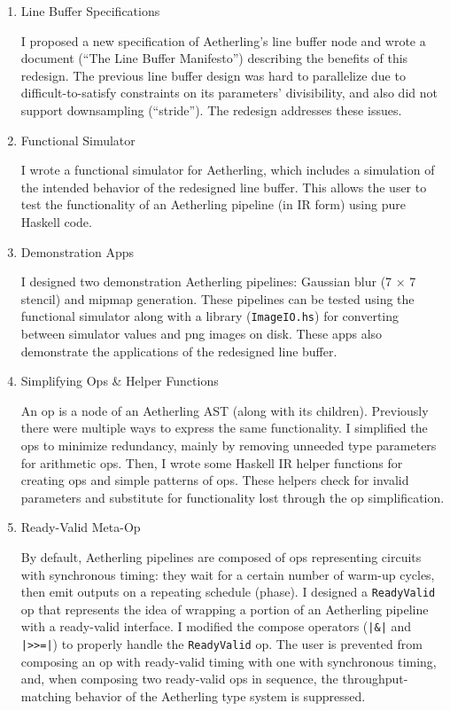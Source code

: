 \documentclass[12pt]{article}
\begin{document}
\begin{enumerate}

\item Line Buffer Specifications

I proposed a new specification of Aetherling's line buffer node and
wrote a document (``The Line Buffer Manifesto'') describing the
benefits of this redesign. The previous line buffer design was hard to
parallelize due to difficult-to-satisfy constraints on its parameters'
divisibility, and also did not support downsampling (``stride'').
The redesign addresses these issues.


\item Functional Simulator

I wrote a functional simulator for Aetherling, which includes a
simulation of the intended behavior of the redesigned line
buffer. This allows the user to test the functionality of an
Aetherling pipeline (in IR form) using pure Haskell code.

\item Demonstration Apps

I designed two demonstration Aetherling pipelines: Gaussian blur (7
$\times$ 7 stencil) and mipmap generation. These pipelines can be
tested using the functional simulator along with a library
(\texttt{ImageIO.hs}) for converting between simulator values and png
images on disk. These apps also demonstrate the applications of the
redesigned line buffer.

\item Simplifying Ops \& Helper Functions

An op is a node of an Aetherling AST (along with its
children). Previously there were multiple ways to express the same
functionality. I simplified the ops to minimize redundancy, mainly by
removing unneeded type parameters for arithmetic ops. Then, I wrote
some Haskell IR helper functions for creating ops and simple patterns
of ops. These helpers check for invalid parameters and substitute for
functionality lost through the op simplification.

\item Ready-Valid Meta-Op

By default, Aetherling pipelines are composed of ops representing
circuits with synchronous timing: they wait for a certain number of
warm-up cycles, then emit outputs on a repeating schedule (phase). I
designed a \texttt{ReadyValid} op that represents the idea of wrapping
a portion of an Aetherling pipeline with a ready-valid interface.  I
modified the compose operators (\texttt{|\&|} and \texttt{|>>=|}) to
properly handle the \texttt{ReadyValid} op.  The user is prevented from
composing an op with ready-valid timing with one with synchronous
timing, and, when composing two ready-valid ops in sequence, the
throughput-matching behavior of the Aetherling type system is
suppressed.


\end{enumerate}
\end{document}
